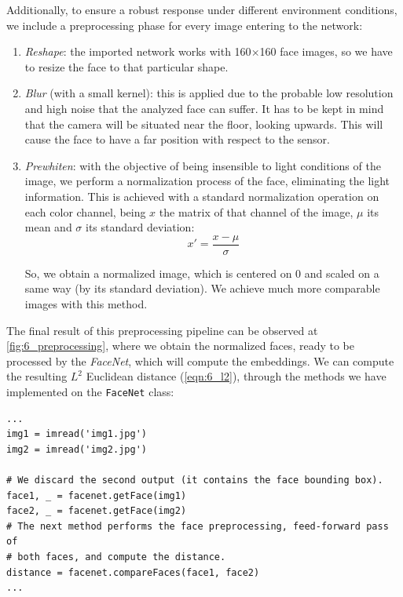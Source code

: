  Additionally, to ensure a robust response under different environment conditions, we include a preprocessing phase for every image entering to the network:
 \begin{enumerate}
 	\item \emph{Reshape}: the imported network works with 160$\times$160 face images, so we have to resize the face to that particular shape.
 	
 	\item \emph{Blur} (with a small kernel): this is applied due to the probable low resolution and high noise that the analyzed face can suffer. It has to be kept in mind that the camera will be situated near the floor, looking upwards. This will cause the face to have a far position with respect to the sensor.
 	
 	\item \emph{Prewhiten}: with the objective of being insensible to light conditions of the image, we perform a normalization process of the face, eliminating the light information. This is achieved with a standard normalization operation on each color channel, being $x$ the matrix of that channel of the image, $\mu$ its mean and $\sigma$ its standard deviation:
 	\begin{equation}
	 	x' = \frac{x - \mu}{\sigma}
 	\end{equation}
 	
 	So, we obtain a normalized image, which is centered on $0$ and scaled on a same way (by its standard deviation). We achieve much more comparable images with this method.
 \end{enumerate}
 
 The final result of this preprocessing pipeline can be observed at \autoref{fig:6_preprocessing}, where we obtain the normalized faces, ready to be processed by the \emph{FaceNet}, which will compute the embeddings. We can compute the resulting $L^2$ Euclidean distance (\autoref{eqn:6_l2}), through the methods we have implemented on the \texttt{FaceNet} class:
 
 \begin{lstlisting}
...
img1 = imread('img1.jpg')
img2 = imread('img2.jpg')

# We discard the second output (it contains the face bounding box).
face1, _ = facenet.getFace(img1)
face2, _ = facenet.getFace(img2)
# The next method performs the face preprocessing, feed-forward pass of
# both faces, and compute the distance.
distance = facenet.compareFaces(face1, face2)
...
 \end{lstlisting}
 
